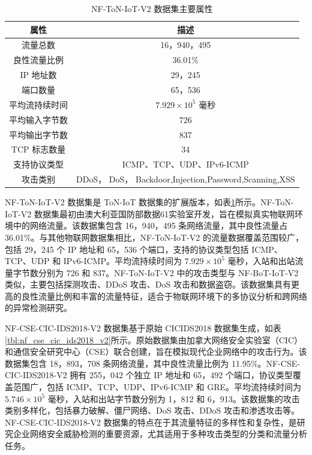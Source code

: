 \documentclass[promaster]{thesis-uestc}
\begin{document}
\begin{table}[h!]
    \centering
    \caption{NF-ToN-IoT-V2 数据集主要属性}
    \begin{tabular}{c||c} \hline\hline
        \textbf{属性} & \textbf{描述} \\ \hline
        流量总数 & 16，940，495 \\ \hline
        良性流量比例 & 36.01\% \\ \hline
        IP 地址数 & 29，245 \\ \hline
        端口数量 & 65，536 \\ \hline
        平均流持续时间 & $7.929 \times 10^5$ 毫秒 \\ \hline
        平均输入字节数 & 726 \\ \hline
        平均输出字节数 & 837 \\ \hline
        TCP 标志数量 & 34 \\ \hline
        支持协议类型 & ICMP、TCP、UDP、IPv6-ICMP \\ \hline
        攻击类别 &  DDoS， DoS， Backdoor,Injection,Password,Scanning,XSS \\ \hline\hline
    \end{tabular}
    \label{tbl:nf_ton_iot_v2}
\end{table}
NF-ToN-IoT-V2 数据集是 ToN-IoT 数据集的扩展版本，如表\ref{tbl:nf_ton_iot_v2}所示。NF-ToN-IoT-V2 数据集最初由澳大利亚国防部数据61实验室开发，旨在模拟真实物联网环境中的网络流量。该数据集包含 16，940，495 条网络流量，其中良性流量占 36.01\%。与其他物联网数据集相比，NF-ToN-IoT-V2 的流量数据覆盖范围较广，包括 29，245 个 IP 地址和 65，536 个端口，支持的协议类型包括 ICMP、TCP、UDP 和 IPv6-ICMP。平均流持续时间为 $7.929 \times 10^5$ 毫秒，入站和出站流量字节数分别为 726 和 837。NF-ToN-IoT-V2 中的攻击类型与 NF-BoT-IoT-V2 类似，主要包括探测攻击、DDoS 攻击、DoS 攻击和数据盗窃。该数据集具有更高的良性流量比例和丰富的流量特征，适合于物联网环境下的多协议分析和跨网络的异常检测研究。

NF-CSE-CIC-IDS2018-V2 数据集基于原始 CICIDS2018 数据集生成，如表\ref{tbl:nf_cse_cic_ids2018_v2}所示。原始数据集由加拿大网络安全实验室（CIC）和通信安全研究中心（CSE）联合创建，旨在模拟现代企业网络中的攻击行为。该数据集包含 18，893，708 条网络流量，其中良性流量比例为 11.95\%。NF-CSE-CIC-IDS2018-V2 拥有 255，042 个独立 IP 地址和 65，492 个端口，协议类型覆盖范围广，包括 ICMP、TCP、UDP、IPv6-ICMP 和 GRE。平均流持续时间为 $5.746 \times 10^5$ 毫秒，入站和出站字节数分别为 1，812 和 6，913。该数据集的攻击类别多样化，包括暴力破解、僵尸网络、DoS 攻击、DDoS 攻击和渗透攻击等。NF-CSE-CIC-IDS2018-V2 数据集的特点在于其流量特征的多样性和复杂性，是研究企业网络安全威胁检测的重要资源，尤其适用于多种攻击类型的分类和流量分析任务。
\end{document}

